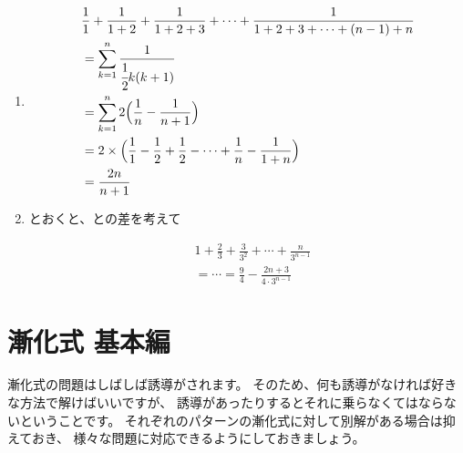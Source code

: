 \documentclass[a4paper]{ltjsarticle}
\newcommand{\flan}[1]{\begin{fleqn}[20pt]\begin{align*} #1 \end{align*}\end{fleqn}}
\begin{document}
\begin{question*}
\begin{ans*}
\begin{enumerate}[label=\arabic*.]
  \item
          \flan{
              &\frac{1}{1} + \frac{1}{1+2} + \frac{1}{1+2+3} + \cdots + \frac{1}{1+2+3+\cdots +(n-1)+n} \\
              &= \sum_{k=1}^{n}\frac{1}{\cfrac{1}{2}k(k+1)} \\
              &= \sum_{k=1}^{n}2\Bigl(\frac{1}{n} - \frac{1}{n+1}\Bigr) \\
              &= 2\tm\Bigl(\frac{1}{1} - \frac{1}{2} + \frac{1}{2} - \cdots + \frac{1}{n} - \frac{1}{1+n}\Bigr) \\
              &= \frac{2n}{n+1}
            }
  \item {}とおくと、との差を考えて
          \flan{
              &1+\frac{2}{3}+\frac{3}{3^2}+\cdots+\frac{n}{3^{n-1}} \\
              &= \cdots = \frac{9}{4} - \frac{2n+3}{4\cdot 3^{n-1}}
            }
\end{enumerate}
\end{ans*}
\end{question*}


\newpage
\section{漸化式 基本編}\label{sec:basic_of_recurrenceformula}

漸化式の問題はしばしば誘導がされます。
そのため、何も誘導がなければ好きな方法で解けばいいですが、
誘導があったりするとそれに乗らなくてはならないということです。
それぞれのパターンの漸化式に対して別解がある場合は抑えておき、
様々な問題に対応できるようにしておきましょう。
\end{document}
